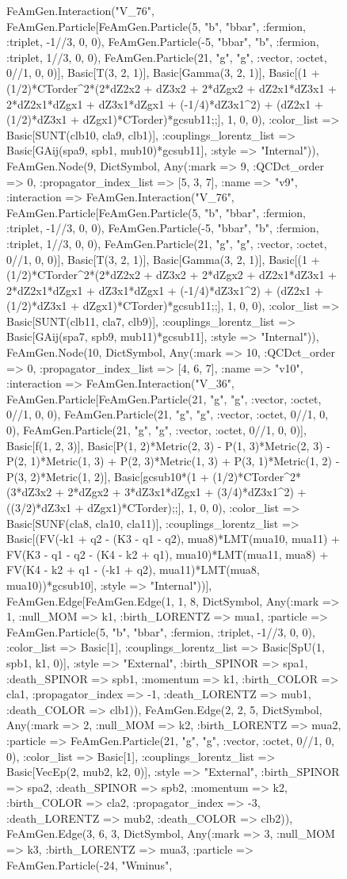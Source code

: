 \documentclass{revtex4}
\begin{document}
\begin{figure}[!htb]
\begin{center}
{FeAmGen.Interaction("V_76", FeAmGen.Particle[FeAmGen.Particle(5, "b", "bbar", :fermion, :triplet, -1//3, 0, 0), FeAmGen.Particle(-5, "bbar", "b", :fermion, :triplet, 1//3, 0, 0), FeAmGen.Particle(21, "g", "g", :vector, :octet, 0//1, 0, 0)], Basic[T(3, 2, 1)], Basic[Gamma(3, 2, 1)], Basic[(1 + (1/2)*CTorder^2*(2*dZ2x2 + dZ3x2 + 2*dZgx2 + dZ2x1*dZ3x1 + 2*dZ2x1*dZgx1 + dZ3x1*dZgx1 + (-1/4)*dZ3x1^2) + (dZ2x1 + (1/2)*dZ3x1 + dZgx1)*CTorder)*gcsub11;;], 1, 0, 0), :color_list => Basic[SUNT(clb10, cla9, clb1)], :couplings_lorentz_list => Basic[GAij(spa9, spb1, mub10)*gcsub11], :style => "Internal")), FeAmGen.Node(9, Dict{Symbol, Any}(:mark => 9, :QCDct_order => 0, :propagator_index_list => [5, 3, 7], :name => "v9", :interaction => FeAmGen.Interaction("V_76", FeAmGen.Particle[FeAmGen.Particle(5, "b", "bbar", :fermion, :triplet, -1//3, 0, 0), FeAmGen.Particle(-5, "bbar", "b", :fermion, :triplet, 1//3, 0, 0), FeAmGen.Particle(21, "g", "g", :vector, :octet, 0//1, 0, 0)], Basic[T(3, 2, 1)], Basic[Gamma(3, 2, 1)], Basic[(1 + (1/2)*CTorder^2*(2*dZ2x2 + dZ3x2 + 2*dZgx2 + dZ2x1*dZ3x1 + 2*dZ2x1*dZgx1 + dZ3x1*dZgx1 + (-1/4)*dZ3x1^2) + (dZ2x1 + (1/2)*dZ3x1 + dZgx1)*CTorder)*gcsub11;;], 1, 0, 0), :color_list => Basic[SUNT(clb11, cla7, clb9)], :couplings_lorentz_list => Basic[GAij(spa7, spb9, mub11)*gcsub11], :style => "Internal")), FeAmGen.Node(10, Dict{Symbol, Any}(:mark => 10, :QCDct_order => 0, :propagator_index_list => [4, 6, 7], :name => "v10", :interaction => FeAmGen.Interaction("V_36", FeAmGen.Particle[FeAmGen.Particle(21, "g", "g", :vector, :octet, 0//1, 0, 0), FeAmGen.Particle(21, "g", "g", :vector, :octet, 0//1, 0, 0), FeAmGen.Particle(21, "g", "g", :vector, :octet, 0//1, 0, 0)], Basic[f(1, 2, 3)], Basic[P(1, 2)*Metric(2, 3) - P(1, 3)*Metric(2, 3) - P(2, 1)*Metric(1, 3) + P(2, 3)*Metric(1, 3) + P(3, 1)*Metric(1, 2) - P(3, 2)*Metric(1, 2)], Basic[gcsub10*(1 + (1/2)*CTorder^2*(3*dZ3x2 + 2*dZgx2 + 3*dZ3x1*dZgx1 + (3/4)*dZ3x1^2) + ((3/2)*dZ3x1 + dZgx1)*CTorder);;], 1, 0, 0), :color_list => Basic[SUNF(cla8, cla10, cla11)], :couplings_lorentz_list => Basic[(FV(-k1 + q2 - (K3 - q1 - q2), mua8)*LMT(mua10, mua11) + FV(K3 - q1 - q2 - (K4 - k2 + q1), mua10)*LMT(mua11, mua8) + FV(K4 - k2 + q1 - (-k1 + q2), mua11)*LMT(mua8, mua10))*gcsub10], :style => "Internal"))], FeAmGen.Edge[FeAmGen.Edge(1, 1, 8, Dict{Symbol, Any}(:mark => 1, :null_MOM => k1, :birth_LORENTZ => mua1, :particle => FeAmGen.Particle(5, "b", "bbar", :fermion, :triplet, -1//3, 0, 0), :color_list => Basic[1], :couplings_lorentz_list => Basic[SpU(1, spb1, k1, 0)], :style => "External", :birth_SPINOR => spa1, :death_SPINOR => spb1, :momentum => k1, :birth_COLOR => cla1, :propagator_index => -1, :death_LORENTZ => mub1, :death_COLOR => clb1)), FeAmGen.Edge(2, 2, 5, Dict{Symbol, Any}(:mark => 2, :null_MOM => k2, :birth_LORENTZ => mua2, :particle => FeAmGen.Particle(21, "g", "g", :vector, :octet, 0//1, 0, 0), :color_list => Basic[1], :couplings_lorentz_list => Basic[VecEp(2, mub2, k2, 0)], :style => "External", :birth_SPINOR => spa2, :death_SPINOR => spb2, :momentum => k2, :birth_COLOR => cla2, :propagator_index => -3, :death_LORENTZ => mub2, :death_COLOR => clb2)), FeAmGen.Edge(3, 6, 3, Dict{Symbol, Any}(:mark => 3, :null_MOM => k3, :birth_LORENTZ => mua3, :particle => FeAmGen.Particle(-24, "Wminus", }
\end{center}
\end{figure}
\end{document}
